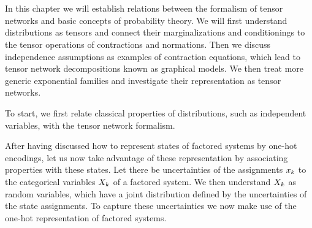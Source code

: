 \chapter{\chatextprobRepresentation}\label{cha:probRepresentation}

In this chapter we will establish relations between the formalism of tensor networks and basic concepts of probability theory.
We will first understand distributions as tensors and connect their marginalizations and conditionings to the tensor operations of contractions and normations.
Then we discuss independence assumptions as examples of contraction equations, which lead to tensor network decompositions known as graphical models.
We then treat more generic exponential families and investigate their representation as tensor networks.



To start, we first relate classical properties of distributions, such as independent variables, with the tensor network formalism.


After having discussed how to represent states of factored systems by one-hot encodings, let us now take advantage of these representation by associating properties with these states.
Let there be uncertainties of the assignments $x_{k}$ to the categorical variables $X_{k}$ of a factored system.
We then understand $X_{k}$ as random variables, which have a joint distribution defined by the uncertainties of the state assignments.
To capture these uncertainties we now make use of the one-hot representation of factored systems.

